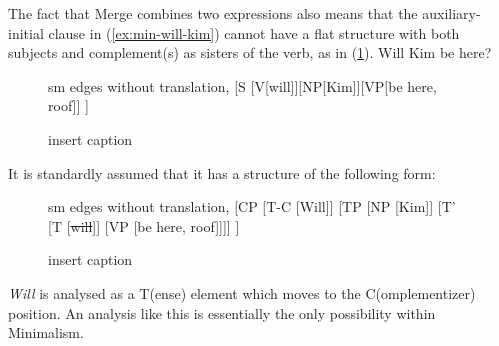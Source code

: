 \documentclass[output=paper]{langsci/langscibook}
\begin{document}
The fact that Merge combines two expressions also means that the auxiliary-initial clause in (\ref{ex:min-will-kim}) cannot have a flat structure with both subjects and complement(s) as sisters of the verb, as in (\ref{fig:will-kim}).
\ea
Will Kim be here?\label{ex:min-will-kim}
\z

\begin{figure}[h!]
	\centering
	\begin{forest} sm edges without translation, 
		[S
		[V[will]][NP[Kim]][VP[be here, roof]]
		]
	\end{forest}
	\caption{\label{fig:will-kim}insert caption}
\end{figure}

It is standardly assumed that it has a structure of the following form:

\begin{figure}[h!]
	\centering
	\begin{forest} sm edges without translation, 
		[CP
		[T-C [Will]] 
		[TP [NP [Kim]]
			[T' [T [\sout{will}]]
			[VP [be here, roof]]]]
		]
	\end{forest}
	\caption{\label{fig:will-kim-b}insert caption}
\end{figure}

\textit{Will} is analysed as a T(ense) element which moves to the C(omplementizer) position. An analysis like this is essentially the only possibility within Minimalism.
\end{document}
